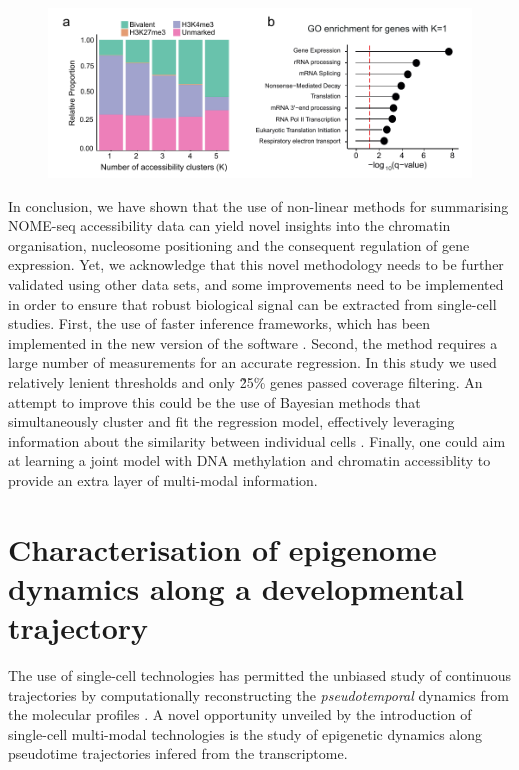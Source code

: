 \begin{figure}[H]
	\centering
	\includegraphics[width=0.9\linewidth]{scNMT_profiles_clusters2}
	\caption[]{}
	\label{fig:scnmt_profiles_clusters2}
\end{figure}





In conclusion, we have shown that the use of non-linear methods for summarising NOME-seq accessibility data can yield novel insights into the chromatin organisation, nucleosome positioning and the consequent regulation of gene expression. Yet, we acknowledge that this novel methodology needs to be further validated using other data sets, and some improvements need to be implemented in order to ensure that robust biological signal can be extracted from single-cell studies. First, the use of faster inference frameworks, which has been implemented in the new version of the software \cite{Kapourani2018}. Second, the method requires a large number of measurements for an accurate regression. In this study we used relatively lenient thresholds and only \~25\% genes passed coverage filtering. An attempt to improve this could be the use of Bayesian methods that simultaneously cluster and fit the regression model, effectively leveraging information about the similarity between individual cells \cite{Kapourani2018b}. Finally, one could aim at learning a joint model with DNA methylation and chromatin accessiblity to provide an extra layer of multi-modal information.


\section{Characterisation of epigenome dynamics along a developmental trajectory}
The use of single-cell technologies has permitted the unbiased study of continuous trajectories by computationally reconstructing the \textit{pseudotemporal} dynamics from the molecular profiles \cite{Trapnell2014,Haghverdi2016,Saelens2018}. A novel opportunity unveiled by the introduction of single-cell multi-modal technologies is the study of epigenetic dynamics along pseudotime trajectories infered from the transcriptome.\\

